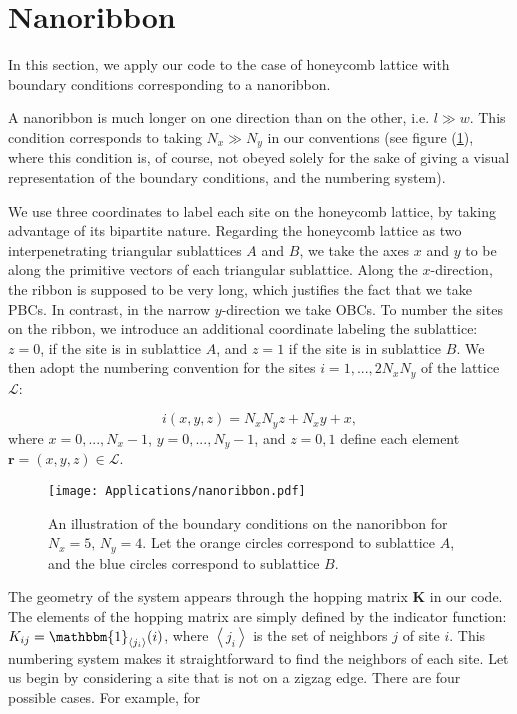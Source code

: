 \section{Nanoribbon}
\label{sec:nanoribbon}

In this section, we apply our code to the case of honeycomb lattice with boundary conditions corresponding to a nanoribbon.

A nanoribbon is much longer on one direction than on the other, i.e. $l \gg w$. 
This condition corresponds to taking $N_x \gg N_y$ in our conventions (see figure (\ref{fig:nanoribbon}), where this condition is, of course, not obeyed solely for the sake of giving a visual representation of the boundary conditions, and the numbering system).

We use three coordinates to label each site on the honeycomb lattice, by taking advantage of its bipartite nature.
Regarding the honeycomb lattice as two interpenetrating triangular sublattices $A$ and $B$, we take the axes $x$ and $y$ to be along the primitive vectors of each triangular sublattice.
Along the $x$-direction, the ribbon is supposed to be very long, which justifies the fact that we take \acp{PBC}.
In contrast, in the narrow $y$-direction we take \acp{OBC}.
To number the sites on the ribbon, we introduce an additional coordinate labeling the sublattice: $z = 0$, if the site is in sublattice $A$, and $z = 1$ if the site is in sublattice $B$.
We then adopt the numbering convention for the sites $i = 1, ..., 2 N_x N_y$ of the lattice $\mathcal{L}$:

\begin{equation}\label{eq:numbering}
i (x, y, z) = N_x N_y z + N_x y + x,
\end{equation}
where $x = 0, ..., N_x - 1$, $y = 0, ..., N_y - 1$, and $z = 0, 1$ define each element $\bm r = (x, y, z) \in \mathcal{L}$.

\begin{figure}[H]
	\centering
\texttt{[image: Applications/nanoribbon.pdf]}
	\caption[Boundary conditions on the nanoribbon.]{An illustration of the boundary conditions on the nanoribbon for $N_x = 5, \, N_y = 4$. Let the orange circles correspond to sublattice $A$, and the blue circles correspond to sublattice $B$.}
	\label{fig:nanoribbon}
\end{figure}

The geometry of the system appears through the hopping matrix $\bm K$ in our code.
The elements of the hopping matrix are simply defined by the indicator function: $K_{ij} = \mathbbm{1}_{\left\langle j_i \right\rangle} (i)$, where $\left\langle j_i \right\rangle$ is the set of neighbors $j$ of site $i$.
This numbering system makes it straightforward to find the neighbors of each site.
Let us begin by considering a site that is not on a zigzag edge.
There are four possible cases. For example, for 


